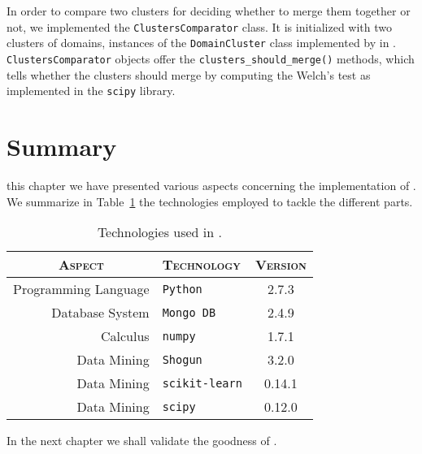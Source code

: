 In order to compare two clusters for deciding whether to merge them together or not,
we implemented the \texttt{ClustersComparator} class. It is initialized with two
clusters of domains, instances of the \texttt{DomainCluster} class implemented
by \citet{schiavoni2013} in \phoenix. \texttt{ClustersComparator} objects offer
the \texttt{clusters\_should\_merge()} methods, which tells whether the clusters should
merge by computing the Welch's test as implemented in the \texttt{scipy} library.

\section{Summary} %
\label{sec:summary}
 this chapter we have presented various aspects concerning the
implementation of \thesystem. We summarize in Table~\ref{tab:techs} the
technologies employed to tackle the different parts.

\begin{table}[!htp]
    \centering
    \begin{tabular}{rlc}
        \toprule
        \multicolumn{1}{c}{\textsc{Aspect}} & \textsc{Technology} & \textsc{Version} \\
        \midrule
        Programming Language & \texttt{Python}       & 2.7.3 \\
        Database System      & \texttt{Mongo DB}     & 2.4.9 \\
        Calculus             & \texttt{numpy}        & 1.7.1 \\
        Data Mining          & \texttt{Shogun}       & 3.2.0 \\
        Data Mining          & \texttt{scikit-learn} & 0.14.1 \\
        Data Mining          & \texttt{scipy}        & 0.12.0 \\
        \bottomrule
    \end{tabular}
    \caption{Technologies used in \thesystem.}
    \label{tab:techs}
\end{table}

In the next chapter we shall validate the goodness of \thesystem.
